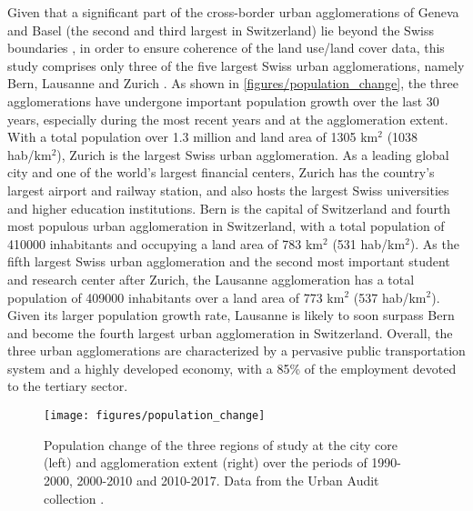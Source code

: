 Given that a significant part of the cross-border urban agglomerations of Geneva and Basel (the second and third largest in Switzerland) lie beyond the Swiss boundaries , in order to ensure coherence of the land use/land cover data, this study comprises only three of the five largest Swiss urban agglomerations, namely Bern, Lausanne and Zurich .
As shown in \autoref{figures/population_change}, the three agglomerations have undergone important population growth over the last 30 years, especially during the most recent years and at the agglomeration extent.
With a total population over 1.3 million and land area of 1305 km$^2$ (1038 hab/km$^2$), Zurich is the largest Swiss urban agglomeration. As a leading global city and one of the world's largest financial centers, Zurich has the country's largest airport and railway station, and also hosts the largest Swiss universities and higher education institutions. 
Bern is the capital of Switzerland and fourth most populous urban agglomeration in Switzerland, with a total population of 410000 inhabitants and occupying a land area of 783 km$^2$ (531 hab/km$^2$). As the fifth largest Swiss urban agglomeration and the second most important student and research center after Zurich, the Lausanne agglomeration has a total population of 409000 inhabitants over a land area of 773 km$^2$ (537 hab/km$^2$). Given its larger population growth rate, Lausanne is likely to soon surpass Bern and become the fourth largest urban agglomeration in Switzerland.
Overall, the three urban agglomerations are characterized by a pervasive public transportation system and a highly developed economy, with a 85\% of the employment devoted to the tertiary sector.

\begin{figure}[!ht]
    \centering  
    \texttt{[image: figures/population\_change]}
    \vspace{.5em}
    \caption[Population change]{\label{figures/population_change}Population change of the three regions of study at the city core (left) and agglomeration extent (right) over the periods of 1990-2000, 2000-2010 and 2010-2017. Data from the Urban Audit collection .}
\end{figure}


